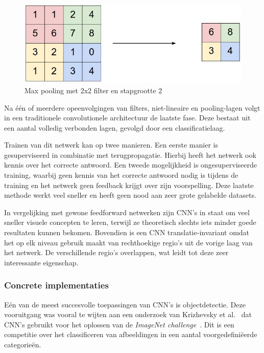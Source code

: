\begin{figure}[tb]
    \centering
    \includegraphics[width=0.6\linewidth]{Images/maxpool.png}
    \caption{Max pooling met 2x2 filter en stapgrootte 2~\cite{maxpool}}
    \label{fig:maxpool}
\end{figure}

Na \'e\'en of meerdere opeenvolgingen van filters, niet-lineaire en pooling-lagen volgt in een traditionele convolutionele architectuur de laatste fase. Deze bestaat uit een aantal volledig verbonden lagen, gevolgd door een classificatielaag.

Trainen van dit netwerk kan op twee manieren. Een eerste manier is gesuperviseerd in combinatie met terugpropagatie. Hierbij heeft het netwerk ook kennis over het correcte antwoord. Een tweede mogelijkheid is ongesuperviseerde training, waarbij geen kennis van het correcte antwoord nodig is tijdens de training en het netwerk geen feedback krijgt over zijn voorspelling. Deze laatste methode werkt veel sneller en heeft geen nood aan zeer grote gelabelde datasets. 

In vergelijking met gewone feedforward netwerken zijn CNN's in staat om veel sneller visuele concepten te leren, terwijl ze theoretisch slechts iets minder goede resultaten kunnen bekomen.
Bovendien is een CNN translatie-invariant omdat het op elk niveau gebruik maakt van rechthoekige regio's uit de vorige laag van het netwerk. De verschillende regio's overlappen, wat leidt tot deze zeer interessante eigenschap.

\subsubsection[]{Concrete implementaties}
E\'en van de meest succesvolle toepassingen van CNN's is objectdetectie. Deze vooruitgang was vooral te wijten aan een onderzoek van Krizhevsky et al.~\cite{Krizhevsky2012a} dat CNN's gebruikt voor het oplossen van de \emph{ImageNet challenge}~\cite{Russakovsky2014}.
Dit is een competitie over het classificeren van afbeeldingen in een aantal voorgedefini\"eerde categorie\"en. 

